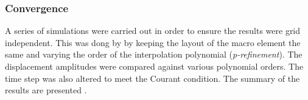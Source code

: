  
 
 
 

\subsubsection{Convergence}

A series of simulations were carried out in order to ensure the results were grid independent. This was dong by by keeping the layout of the macro element the same and varying the order of the interpolation polynomial (\emph{p-refinement}). The displacement amplitudes were compared against various polynomial orders. The time step was also altered to meet the Courant condition. The summary of the results are presented .


















